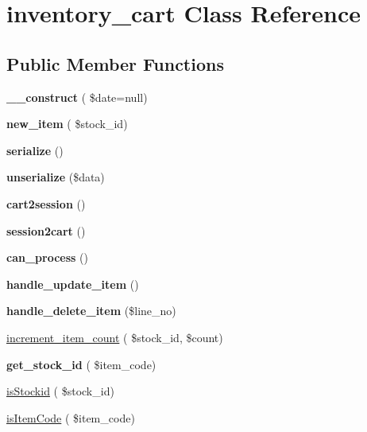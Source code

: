 \hypertarget{classinventory__cart}{}\section{inventory\+\_\+cart Class Reference}
\label{classinventory__cart}
\subsection*{Public Member Functions}
\begin{DoxyCompactItemize}
\item 
\hypertarget{classinventory__cart_ad181b1f15c4e0342cd9cd54df9a2c8b7}{}\label{classinventory__cart_ad181b1f15c4e0342cd9cd54df9a2c8b7} 
{\bfseries \+\_\+\+\_\+construct} ( \$date=null)
\item 
\hypertarget{classinventory__cart_aa609c5eeaf39f8fe416ac2093d81d94b}{}\label{classinventory__cart_aa609c5eeaf39f8fe416ac2093d81d94b} 
{\bfseries new\+\_\+item} ( \$stock\+\_\+id)
\item 
\hypertarget{classinventory__cart_a1d31465361c00aad624a82933b3c1d63}{}\label{classinventory__cart_a1d31465361c00aad624a82933b3c1d63} 
{\bfseries serialize} ()
\item 
\hypertarget{classinventory__cart_ac988218bdcff3a458f505c4999e3e4b3}{}\label{classinventory__cart_ac988218bdcff3a458f505c4999e3e4b3} 
{\bfseries unserialize} (\$data)
\item 
\hypertarget{classinventory__cart_a6ca9bac672c850544da5ec593d89458f}{}\label{classinventory__cart_a6ca9bac672c850544da5ec593d89458f} 
{\bfseries cart2session} ()
\item 
\hypertarget{classinventory__cart_a62b8732c8d7f083f58c7839d020c0ba6}{}\label{classinventory__cart_a62b8732c8d7f083f58c7839d020c0ba6} 
{\bfseries session2cart} ()
\item 
\hypertarget{classinventory__cart_aa47a62325020ad6b5eb6acf5927ce65a}{}\label{classinventory__cart_aa47a62325020ad6b5eb6acf5927ce65a} 
{\bfseries can\+\_\+process} ()
\item 
\hypertarget{classinventory__cart_a00e14d7734a32d9192631ab8349d024e}{}\label{classinventory__cart_a00e14d7734a32d9192631ab8349d024e} 
{\bfseries handle\+\_\+update\+\_\+item} ()
\item 
\hypertarget{classinventory__cart_ae283c95df0a280d6037ad59d0f6e71f1}{}\label{classinventory__cart_ae283c95df0a280d6037ad59d0f6e71f1} 
{\bfseries handle\+\_\+delete\+\_\+item} (\$line\+\_\+no)
\item 
\hyperlink{classinventory__cart_af2060bcea0c8fd54ae0a2e5550a44935}{increment\+\_\+item\+\_\+count} ( \$stock\+\_\+id, \$count)
\item 
\hypertarget{classinventory__cart_ada03f4b41aa7aef0b29aa187a09ae857}{}\label{classinventory__cart_ada03f4b41aa7aef0b29aa187a09ae857} 
{\bfseries get\+\_\+stock\+\_\+id} ( \$item\+\_\+code)
\item 
\hyperlink{classinventory__cart_a919740e1d8f9b8d004549eb21e8b551d}{is\+Stockid} ( \$stock\+\_\+id)
\item 
\hyperlink{classinventory__cart_a1dbd58ee440d2ec8763a8cb5d0241f67}{is\+Item\+Code} ( \$item\+\_\+code)
\end{DoxyCompactItemize}
